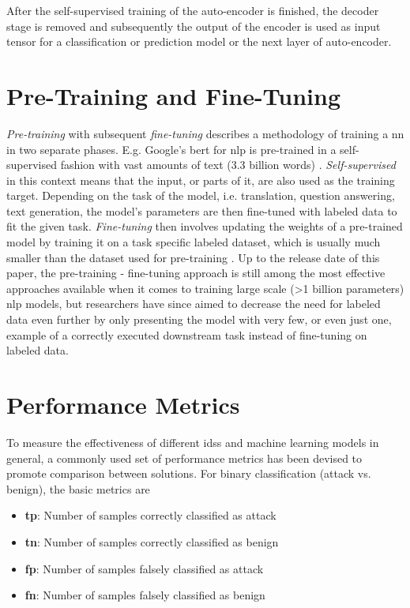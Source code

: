After the self-supervised training of the auto-encoder is finished, the decoder stage is removed and subsequently the output of the encoder is used as input tensor for a classification or prediction model or the next layer of auto-encoder. 

\section{Pre-Training and Fine-Tuning}

\textit{Pre-training} with subsequent \textit{fine-tuning} describes a methodology of training a \gls{nn} in two separate phases. E.g. Google's \gls{bert} for \gls{nlp} is pre-trained in a self-supervised fashion with vast amounts of text (3.3 billion words) \cite{bert}. \textit{Self-supervised} in this context means that the input, or parts of it, are also used as the training target. Depending on the task of the model, i.e. translation, question answering, text generation, the model's parameters are then fine-tuned with labeled data to fit the given task. \textit{Fine-tuning} then involves updating the weights of a pre-trained model by training it on a task specific labeled dataset, which is usually much smaller than the dataset used for pre-training \cite{gpt3}. Up to the release date of this paper, the pre-training - fine-tuning approach is still among the most effective approaches available when it comes to training large scale (>1 billion parameters) \gls{nlp} models, but researchers have since aimed to decrease the need for labeled data even further by only presenting the model with very few, or even just one, example of a correctly executed downstream task \cite{gpt3} instead of fine-tuning on labeled data.

\section{Performance Metrics} \label{sec:background:metrics}

To measure the effectiveness of different \glspl{ids} and machine learning models in general, a commonly used set of performance metrics has been devised to promote comparison between solutions. For binary classification (attack vs. benign), the basic metrics are

\begin{itemize}
	\item \textbf{\gls{tp}}: Number of samples correctly classified as attack
	\item \textbf{\gls{tn}}: Number of samples correctly classified as benign
	\item \textbf{\gls{fp}}: Number of samples falsely classified as attack
	\item \textbf{\gls{fn}}: Number of samples falsely classified as benign
\end{itemize}

